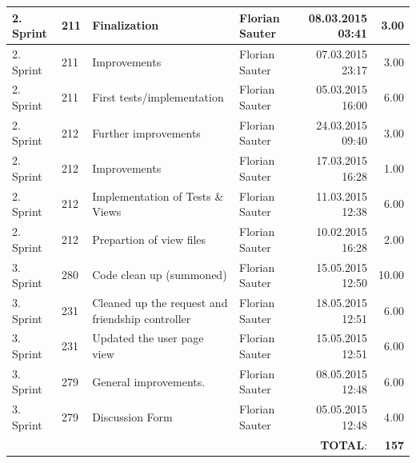\documentclass[a4paper]{article}
\begin{document}
\begin{landscape}
\begin{tabular}{|l|l|l|l|r|r|}
2. Sprint & 211 & Finalization & Florian Sauter & 08.03.2015 03:41 & 3.00 \\ \hline
2. Sprint & 211 & Improvements & Florian Sauter & 07.03.2015 23:17 & 3.00 \\ \hline
2. Sprint & 211 & First tests/implementation & Florian Sauter & 05.03.2015 16:00 & 6.00 \\ \hline
2. Sprint & 212 & Further improvements & Florian Sauter & 24.03.2015 09:40 & 3.00 \\ \hline
2. Sprint & 212 & Improvements & Florian Sauter & 17.03.2015 16:28 & 1.00 \\ \hline
2. Sprint & 212 & Implementation of Tests \& Views & Florian Sauter & 11.03.2015 12:38 & 6.00 \\ \hline
2. Sprint & 212 & Prepartion of view files & Florian Sauter & 10.02.2015 16:28 & 2.00 \\ \hline
3. Sprint & 280 & Code clean up (summoned) & Florian Sauter & 15.05.2015 12:50 & 10.00 \\ \hline
3. Sprint & 231 & Cleaned up the request and friendship controller & Florian Sauter & 18.05.2015 12:51 & 6.00 \\ \hline
3. Sprint & 231 & Updated the user page view & Florian Sauter & 15.05.2015 12:51 & 6.00 \\ \hline
3. Sprint & 279 & General improvements. & Florian Sauter & 08.05.2015 12:48 & 6.00 \\ \hline
3. Sprint & 279 & Discussion Form & Florian Sauter & 05.05.2015 12:48 & 4.00 \\ \hline
 & & & &\textbf{TOTAL}: & \textbf{157} \\ \hline
\end{tabular}



\end{landscape}
\end{document}
